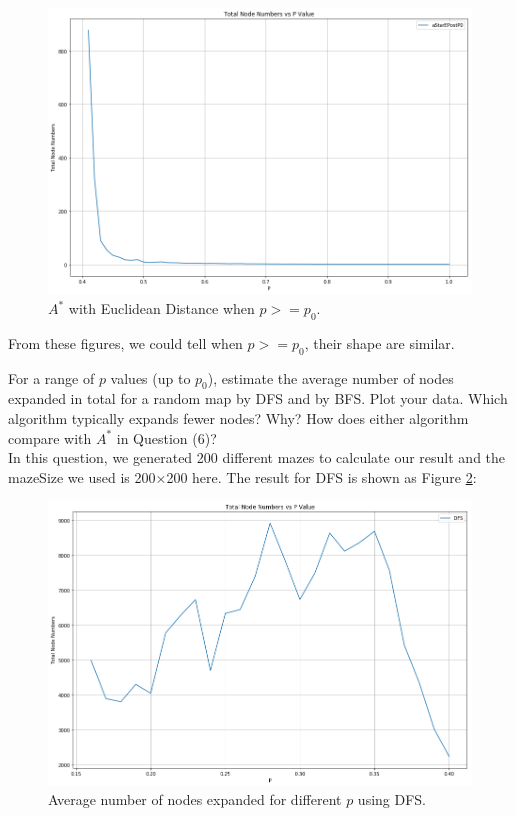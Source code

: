 \documentclass[letter]{article}
\begin{document}
\begin{questions}
	\begin{figure}
		\centering
		\includegraphics[width=\textwidth]{../pics/question6-6.png}
		\caption{\label{fig:6-6} $ A^* $ with Euclidean Distance when $ p >= p_0 $.}
	\end{figure}
	
	From these figures, we could tell when $ p >= p_0 $, their shape are similar. \\
	
	\item {For a range of $ p $ values (up to $ p_0 $), estimate the average number of nodes expanded in total for a random map by DFS and by BFS. Plot your data. Which algorithm typically expands fewer nodes? Why? How does either algorithm compare with $ A^* $ in Question (6)?} \\
	
	In this question, we generated 200 different mazes to calculate our result and the mazeSize we used is 200×200 here.  The result for DFS is shown as Figure \ref{fig:7-1}: \\
	
	\begin{figure}
		\centering
		\includegraphics[width=\textwidth]{../pics/question7-1.png}
		\caption{\label{fig:7-1} Average number of nodes expanded for different $ p $ using DFS.}
	\end{figure}


\end{questions}
\end{document}
